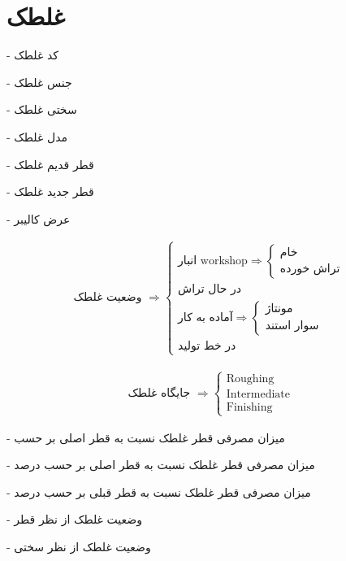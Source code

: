 \documentclass[12pt]{article}
\begin{document}
\section{غلطک}

- کد غلطک 

- جنس غلطک

- سختی غلطک

- مدل غلطک

- قطر قدیم غلطک 

- قطر جدید غلطک 

- عرض کالیبر 




\begin{align*}
\text{وضعیت غلطک }
\Rightarrow
\begin{cases}
\text{انبار workshop}
\Rightarrow
\begin{cases}
\text{خام}
\\
\text{تراش خورده}
\end{cases}
\\
\text{در حال تراش}
\\
\text{آماده به کار}
\Rightarrow
\begin{cases}
\text{مونتاژ}
\\
\text{سوار استند}
\end{cases}
\\
\text{در خط تولید}
\end{cases}
\end{align*}





\begin{align*}
\text{جایگاه غلطک }
\Rightarrow
\begin{cases}
\text{Roughing}
\\
\text{Intermediate}
\\
\text{Finishing}
\end{cases}
\end{align*}




- میزان مصرفی قطر غلطک نسبت به قطر اصلی بر حسب 




- میزان مصرفی قطر غلطک نسبت به قطر اصلی بر حسب درصد


- میزان مصرفی قطر غلطک نسبت به قطر قبلی بر حسب درصد



- وضعیت غلطک از نظر قطر


- وضعیت غلطک از نظر سختی
\end{document}
